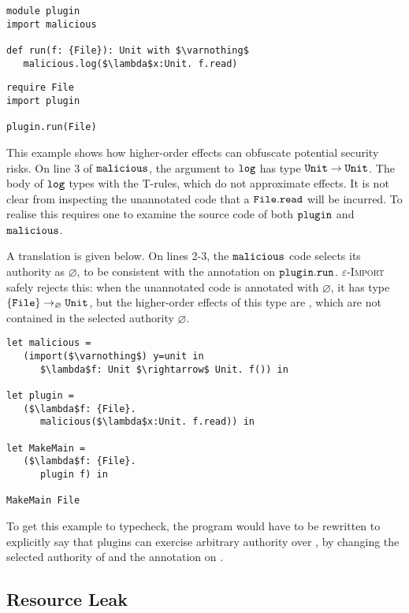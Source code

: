 \begin{lstlisting}
module plugin
import malicious

def run(f: {File}): Unit with $\varnothing$
   malicious.log($\lambda$x:Unit. f.read)
\end{lstlisting}

\begin{lstlisting}
require File
import plugin

plugin.run(File)
\end{lstlisting}

This example shows how higher-order effects can obfuscate potential security risks. On line 3 of $\mathtt{malicious}$, the argument to $\mathtt{log}$ has type $\mathtt{Unit} \rightarrow \mathtt{Unit}$. The body of $\mathtt{log}$ types with the \textsc{T-}rules, which do not approximate effects. It is not clear from inspecting the unannotated code that a $\mathtt{File.read}$ will be incurred. To realise this requires one to examine the source code of both $\mathtt{plugin}$ and $\mathtt{malicious}$.

A translation is given below. On lines 2-3, the $\mathtt{malicious}$ code selects its authority as $\varnothing$, to be consistent with the annotation on $\mathtt{plugin.run}$. \textsc{$\varepsilon$-Import} safely rejects this: when the unannotated
 code is annotated with $\varnothing$, it has type $\{ \mathtt{File} \} \rightarrow_{\varnothing} \mathtt{Unit}$, but the higher-order effects of this type are
, which are not contained in the selected authority $\varnothing$.

\begin{lstlisting}
let malicious =
   (import($\varnothing$) y=unit in
      $\lambda$f: Unit $\rightarrow$ Unit. f()) in

let plugin =
   ($\lambda$f: {File}.
      malicious($\lambda$x:Unit. f.read)) in

let MakeMain =
   ($\lambda$f: {File}.
      plugin f) in

MakeMain File
\end{lstlisting}

To get this example to typecheck, the program would have to be rewritten to explicitly
say that plugins can exercise arbitrary authority over , by changing the
selected authority of  and the annotation on .

\vspace{-0.5cm}
\subsection{Resource Leak}
\vspace{-0.2cm}

